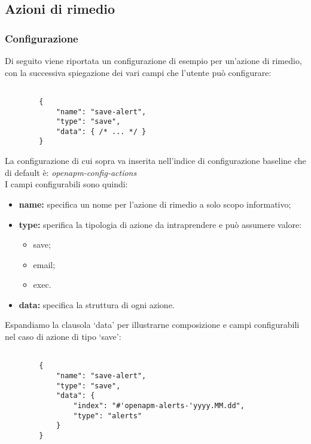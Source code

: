 \subsection{Azioni di rimedio}

	\subsubsection{Configurazione}

	Di seguito viene riportata un configurazione di esempio per un'azione di rimedio, con la successiva spiegazione dei vari campi che l'utente può configurare:

	\begin{lstlisting}[style=json]

		{
			"name": "save-alert",
			"type": "save",
			"data": { /* ... */ }
		}
	\end{lstlisting}

	La configurazione di cui sopra va inserita nell'indice di configurazione baseline che di default è: \textit{openapm-config-actions} \\
	I campi configurabili sono quindi:

	\begin{itemize}
                \item \textbf{name:} specifica un nome per l'azione di rimedio a solo scopo informativo;
                \item \textbf{type:} sperifica la tipologia di azione da intraprendere e può assumere valore:
			\begin{itemize}
                		\item save;
                		\item email;
                		\item exec.
			\end{itemize}
                \item \textbf{data:} specifica la struttura di ogni azione.
	\end{itemize}


	Espandiamo la clausola `data' per illustrarne composizione e campi configurabili nel caso di azione di tipo `save':

	\begin{lstlisting}[style=json]

		{
			"name": "save-alert",
			"type": "save",
			"data": {
				"index": "#'openapm-alerts-'yyyy.MM.dd",
				"type": "alerts"
			}
		}
	\end{lstlisting}


